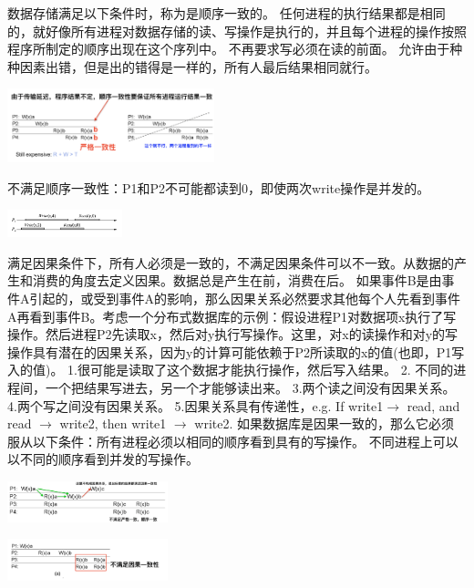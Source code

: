 \documentclass[twoside]{ctexart}
\begin{document}
\begin{multicols}{2}
    数据存储满足以下条件时，称为是顺序一致的。 任何进程的执行结果都是相同的，就好像所有进程对数据存储的读、写操作是执行的，并且每个进程的操作按照程序所制定的顺序出现在这个序列中。  不再要求写必须在读的前面。  允许由于种种因素出错，但是出的错得是一样的，所有人最后结果相同就行。 

  \includegraphics[width=0.45\textwidth,keepaspectratio]{pics/consistency_example1.png}

    不满足顺序一致性：P1和P2不可能都读到0，即使两次write操作是并发的。
    
    \includegraphics[width=0.25\textwidth,keepaspectratio]{pics/sequential.png}
    
    满足因果条件下，所有人必须是一致的，不满足因果条件可以不一致。从数据的产生和消费的角度去定义因果。数据总是产生在前，消费在后。  如果事件B是由事件A引起的，或受到事件A的影响，那么因果关系必然要求其他每个人先看到事件A再看到事件B。考虑一个分布式数据库的示例：假设进程P1对数据项x执行了写操作。然后进程P2先读取x，然后对y执行写操作。这里，对x的读操作和对y的写操作具有潜在的因果关系，因为y的计算可能依赖于P2所读取的x的值(也即，P1写入的值)。  1.很可能是读取了这个数据才能执行操作，然后写入结果。 2. 不同的进程间，一个把结果写进去，另一个才能够读出来。 3.两个读之间没有因果关系。 4.两个写之间没有因果关系。 5.因果关系具有传递性，e.g. If write1$\to$ read, and read $\to$ write2, then write1 $\to$ write2.  如果数据库是因果一致的，那么它必须服从以下条件：所有进程必须以相同的顺序看到具有的写操作。 不同进程上可以以不同的顺序看到并发的写操作。

  \includegraphics[width=0.35\textwidth,keepaspectratio]{pics/consistency_example2.png}
  
  \includegraphics[width=0.35\textwidth,keepaspectratio]{pics/consistency_example3.png}
  

\end{multicols}
\end{document}
